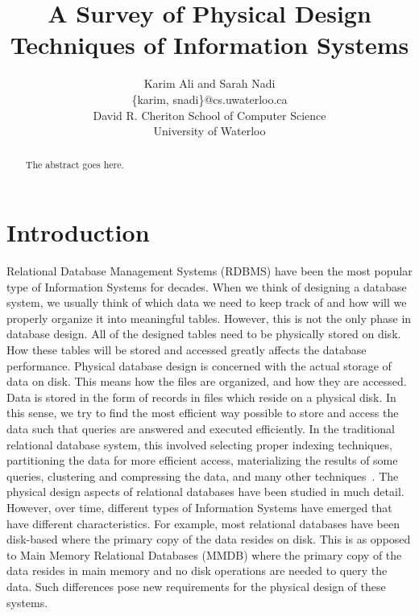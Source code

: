 \documentclass[12pt,a4paper]{article}
\begin{document}
\title{A Survey of Physical Design Techniques of Information Systems}


\author{Karim Ali and Sarah Nadi\\
\{karim, snadi\}@cs.uwaterloo.ca \\
David R. Cheriton School of Computer Science\\
University of Waterloo\\
}

\date{}
\maketitle



\begin{abstract}
The abstract goes here.
\end{abstract}

\section{Introduction}

Relational Database Management Systems (RDBMS) have been the most popular type of Information Systems for decades. When we think of designing a database
system, we usually think of which data we need to keep track of and how will we properly organize it into meaningful tables. However, this is not the only phase
in database design. All of the designed tables need to be physically stored on disk. How these tables will be stored and accessed greatly affects the database
performance. Physical database design is concerned with the actual storage of data on disk. This means how the files are organized, and how they are accessed.
Data is stored in the
form of records in files which reside on a physical disk. In this sense, we try to find the most efficient way possible to store and access the data such that
queries are answered and executed efficiently. In the traditional relational database system, this involved selecting proper indexing techniques,
partitioning the data for more efficient access, materializing the results of some queries, clustering and compressing the data, and many other
techniques~\cite{finkelstein1988physical,lightstone2007physical}. The physical design aspects of relational databases have been studied in much detail. However,
over time, different types of Information Systems have emerged that have different characteristics. For example, most relational databases have been disk-based
where the primary copy of the data resides on disk. This is as opposed to Main Memory Relational Databases (MMDB) where the primary copy of the data resides in
main memory and no disk operations are needed to query the data. Such differences pose new requirements for the physical design of these systems.
\end{document}
